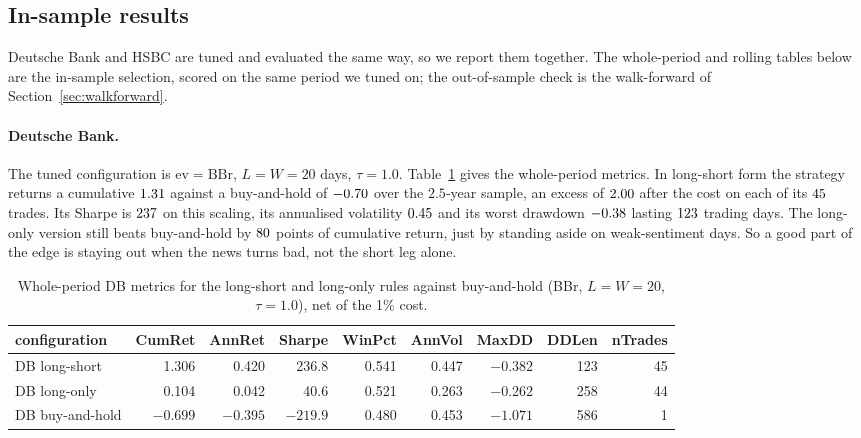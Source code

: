 \documentclass[12pt,a4paper]{article}
\newcommand{\ev}{\mathrm{ev}}
\begin{document}
\subsection{In-sample results}
Deutsche Bank and HSBC are tuned and evaluated the same way, so we report them
together. The whole-period and rolling tables below are the in-sample
selection, scored on the same period we tuned on; the out-of-sample check is the
walk-forward of Section~\ref{sec:walkforward}.

\paragraph{Deutsche Bank.}
The tuned configuration is $\ev=\mathrm{BBr}$, $L=W=20$ days, $\tau=1.0$.
Table~\ref{tab:db_whole} gives the whole-period metrics. In long-short form the
strategy returns a cumulative $1.31$ against a buy-and-hold of
$-0.70$ over the $2.5$-year sample, an excess of $2.00$ after the
cost on each of its $45$ trades. Its Sharpe is $237$ on this
scaling, its annualised volatility $0.45$ and its worst drawdown
$-0.38$ lasting $123$ trading days. The long-only version still
beats buy-and-hold by $80$ points of cumulative
return, just by standing aside on weak-sentiment days. So a good part of the
edge is staying out when the news turns bad, not the short leg alone.

\begin{table}[ht]
\centering
\scriptsize
\setlength{\tabcolsep}{4pt}
\begin{tabular}{lrrrrrrrr}
\toprule
configuration & CumRet & AnnRet & Sharpe & WinPct & AnnVol & MaxDD & DDLen & nTrades \\
\midrule
DB long-short   &  1.306 &  0.420 &  236.8 & 0.541 & 0.447 & $-0.382$ & 123 & 45 \\
DB long-only    &  0.104 &  0.042 &   40.6 & 0.521 & 0.263 & $-0.262$ & 258 & 44 \\
DB buy-and-hold & $-0.699$ & $-0.395$ & $-219.9$ & 0.480 & 0.453 & $-1.071$ & 586 & 1 \\
\bottomrule
\end{tabular}
\caption{Whole-period DB metrics for the long-short and long-only rules against
buy-and-hold (BBr, $L=W=20$, $\tau=1.0$), net of the 1\% cost.}
\label{tab:db_whole}
\end{table}
\end{document}
